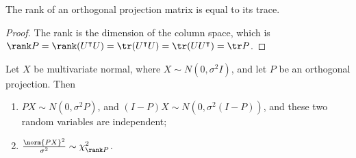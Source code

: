 \begin{proposition}
	The rank of an orthogonal projection matrix is equal to its trace.
\end{proposition}
\begin{proof}
	The rank is the dimension of the column space, which is $\rank P = \rank(U^\tran U) = \tr(U^\tran U) = \tr(U U^\tran) = \tr P$.
\end{proof}
\begin{theorem}
	Let $X$ be multivariate normal, where $X \sim N(0,\sigma^2 I)$, and let $P$ be an orthogonal projection.
	Then
	\begin{enumerate}
		\item $PX \sim N(0,\sigma^2 P)$, and $(I-P)X \sim N(0,\sigma^2(I-P))$, and these two random variables are independent;
		\item $\frac{\norm{PX}^2}{\sigma^2} \sim \chi^2_{\rank P}$.
	\end{enumerate}
\end{theorem}
